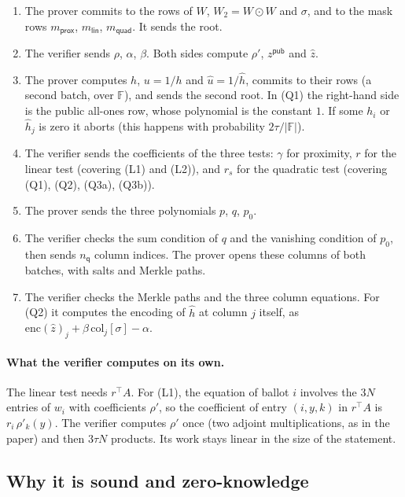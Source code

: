 \documentclass[11pt,a4paper]{article}
\newcommand{\F}{\mathbb{F}}
\newcommand{\nq}{n_{\mathsf{q}}}
\newcommand{\uh}{\hat{u}}
\newcommand{\hh}{\hat{h}}
\newcommand{\zh}{\hat{z}}
\theoremstyle{definition}
\theoremstyle{plain}
\begin{document}
\begin{enumerate}[leftmargin=1.6em,itemsep=2pt]
\item[\textbf{1.}] The prover commits to the rows of $W$, $W_2=W\odot W$ and $\sigma$, and to the mask
  rows $m_{\mathsf{prox}}$, $m_{\mathsf{lin}}$, $m_{\mathsf{quad}}$. It sends the root.
\item[\textbf{2.}] The verifier sends $\rho$, $\alpha$, $\beta$. Both sides compute $\rho'$,
  $z^{\mathsf{pub}}$ and $\zh$.
\item[\textbf{3.}] The prover computes $h$, $u=1/h$ and $\uh=1/\hh$, commits to their rows (a second
  batch, over $\F$), and sends the second root. In (Q1) the right-hand side is the public all-ones
  row, whose polynomial is the constant $1$. If some $h_i$ or $\hh_j$ is zero it aborts (this
  happens with probability $2\tau/|\F|$).
\item[\textbf{4.}] The verifier sends the coefficients of the three tests: $\gamma$ for proximity,
  $r$ for the linear test (covering (L1) and (L2)), and $r_s$ for the quadratic test (covering (Q1),
  (Q2), (Q3a), (Q3b)).
\item[\textbf{5.}] The prover sends the three polynomials $p$, $q$, $p_0$.
\item[\textbf{6.}] The verifier checks the sum condition of $q$ and the vanishing condition of $p_0$,
  then sends $\nq$ column indices. The prover opens these columns of both batches, with salts and
  Merkle paths.
\item[\textbf{7.}] The verifier checks the Merkle paths and the three column equations. For (Q2) it
  computes the encoding of $\hh$ at column $j$ itself, as
  $\mathrm{enc}(\zh)_j+\beta\,\mathrm{col}_j[\sigma]-\alpha$.
\end{enumerate}

\paragraph{What the verifier computes on its own.} The linear test needs $r^{\top}A$. For (L1), the
equation of ballot $i$ involves the $3N$ entries of $w_i$ with coefficients $\rho'$, so the
coefficient of entry $(i,y,k)$ in $r^{\top}A$ is $r_i\,\rho'_k(y)$. The verifier computes $\rho'$ once
(two adjoint multiplications, as in the paper) and then $3\tau N$ products. Its work stays linear
in the size of the statement.

\subsection{Why it is sound and zero-knowledge}
\end{document}

